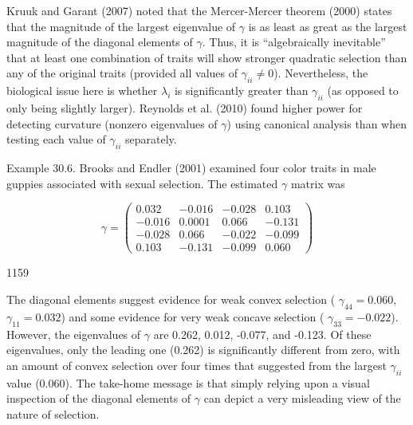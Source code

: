 \documentclass{article}
\begin{document}
Kruuk and Garant (2007) noted that the Mercer-Mercer theorem (2000) states that the magnitude of the largest eigenvalue of  $ \gamma $ is as least as great as the largest magnitude of the diagonal elements of  $ \gamma $. Thus, it is “algebraically inevitable” that at least one combination of traits will show stronger quadratic selection than any of the original traits (provided all values of  $ \gamma_{ii} \neq 0 $). Nevertheless, the biological issue here is whether  $ \lambda_i $ is significantly greater than  $ \gamma_{ii} $ (as opposed to only being slightly larger). Reynolds et al. (2010) found higher power for detecting curvature (nonzero eigenvalues of  $ \gamma $) using canonical analysis than when testing each value of  $ \gamma_{ii} $ separately.

Example 30.6. Brooks and Endler (2001) examined four color traits in male guppies associated with sexual selection. The estimated  $ \gamma $ matrix was

\begin{equation}
\gamma=\begin{pmatrix}0.032&-0.016&-0.028&0.103\\-0.016&0.0001&0.066&-0.131\\-0.028&0.066&-0.022&-0.099\\0.103&-0.131&-0.099&0.060\end{pmatrix}
\end{equation}

1159

The diagonal elements suggest evidence for weak convex selection ( $ \gamma_{44} = 0.060 $,  $ \gamma_{11} = 0.032 $) and some evidence for very weak concave selection ( $ \gamma_{33} = -0.022 $). However, the eigenvalues of  $ \gamma $ are 0.262, 0.012, -0.077, and -0.123. Of these eigenvalues, only the leading one (0.262) is significantly different from zero, with an amount of convex selection over four times that suggested from the largest  $ \gamma_{ii} $ value (0.060). The take-home message is that simply relying upon a visual inspection of the diagonal elements of  $ \gamma $ can depict a very misleading view of the nature of selection.
\end{document}
